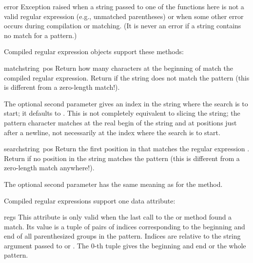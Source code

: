 \begin{excdesc}{error}
  Exception raised when a string passed to one of the functions here
  is not a valid regular expression (e.g., unmatched parentheses) or
  when some other error occurs during compilation or matching.  (It is
  never an error if a string contains no match for a pattern.)
\end{excdesc}

\noindent
Compiled regular expression objects support these methods:

\renewcommand{\indexsubitem}{(regex method)}
\begin{funcdesc}{match}{string\, pos}
  Return how many characters at the beginning of  match
  the compiled regular expression.  Return  if the string
  does not match the pattern (this is different from a zero-length
  match!).
  
  The optional second parameter  gives an index in the string
  where the search is to start; it defaults to .  This is not
  completely equivalent to slicing the string; the  pattern
  character matches at the real begin of the string and at positions
  just after a newline, not necessarily at the index where the search
  is to start.
\end{funcdesc}

\begin{funcdesc}{search}{string\, pos}
  Return the first position in  that matches the regular
  expression .  Return  if no position in the
  string matches the pattern (this is different from a zero-length
  match anywhere!).
  
  The optional second parameter has the same meaning as for the
   method.
\end{funcdesc}

\noindent
Compiled regular expressions support one data attribute:

\renewcommand{\indexsubitem}{(regex attribute)}
\begin{datadesc}{regs}
  This attribute is only valid when the last call to the 
  or  method found a match.  Its value is a tuple of
  pairs of indices corresponding to the beginning and end of all
  parenthesized groups in the pattern.  Indices are relative to the
  string argument passed to  or .  The 0-th
  tuple gives the beginning and end or the whole pattern.
\end{datadesc}

